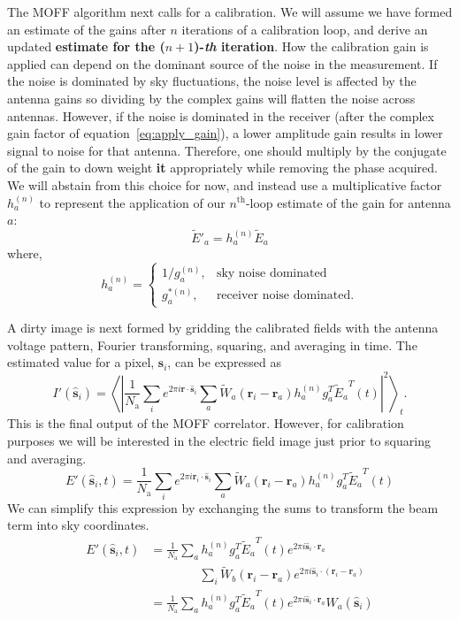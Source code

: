 \documentclass[a4paper,fleqn,usenatbib]{../mnras}
\newcommand{\Nant}{\ensuremath{N_{\mathrm{a}}}}
\newcommand{\s}{\ensuremath{\hat{\mathbf{s}}}} %
\newcommand{\ri}{\ensuremath{\mathbf{r}_i}}
\newcommand{\ra}{\ensuremath{\mathbf{r}_a}}
\newcommand{\beamr}{\ensuremath{\widetilde{W}}}
\newcommand{\beamtheta}{\ensuremath{W}}
\newcommand{\Er}[1]{\ensuremath{\widetilde{E}_{#1}}}
\newcommand{\Erest}[1]{\ensuremath{\widetilde{E}'_{#1}}}
\newcommand{\Ethetaest}{\ensuremath{E'}}
\begin{document}
The MOFF algorithm next calls for a calibration. We will assume we have formed an estimate of the gains after $n$ iterations of a calibration loop, and derive an updated {\bf estimate for the ($n+1$)-{\it th} iteration}. How the calibration gain is applied can depend on the dominant source of the noise in the measurement. If the noise is dominated by sky fluctuations, the noise level is affected by the antenna gains so dividing by the complex gains will flatten the noise across antennas. However, if the noise is dominated in the receiver (after the complex gain factor of equation~\ref{eq:apply_gain}), a lower amplitude gain results in lower signal to noise for that antenna. Therefore, one should multiply by the conjugate of the gain to down weight {\bf it} appropriately while removing the phase acquired. We will abstain from this choice for now, and instead use a multiplicative factor $h^{(n)}_a$ to represent the application of our $n^{\mathrm{th}}$-loop estimate of the gain for antenna $a$:
\begin{equation}
\Erest{a} = h^{(n)}_a \Er{a}
\end{equation}
where,
\begin{equation}
h^{(n)}_a=\begin{cases}
1/g^{(n)}_a, & \mbox{sky noise dominated} \\ 
g^{*(n)}_a, & \mbox{receiver noise dominated}.
\end{cases}
\end{equation}

A dirty image is next formed by gridding the calibrated fields with the antenna voltage pattern, Fourier transforming, squaring, and averaging in time. The estimated value for a pixel, $\s_i$, can be expressed as
\begin{equation}
I'(\s_i) = \left<\left| \frac{1}{\Nant}\sum_i e^{2\pi i \mathbf{r}\cdot \s_i} \sum_a \beamr_a(\ri - \ra) h^{(n)}_a g^T_a \Er{a}^T(t) \right|^2 \right>_t.
\end{equation}
This is the final output of the MOFF correlator. However, for calibration purposes we will be interested in the electric field image just prior to squaring and averaging.
\begin{equation}
\Ethetaest (\s_i,t) = \frac{1}{\Nant} \sum_i e^{2\pi i \ri \cdot \s_i} \sum_a \beamr_a(\ri - \ra) h^{(n)}_a g^T_a \Er{a}^T(t)
\end{equation}
We can simplify this expression by exchanging the sums to transform the beam term into sky coordinates.
\begin{align}\label{eq:epix}
\Ethetaest(\s_i,t) & = \frac{1}{\Nant} \sum_a h^{(n)}_a g^T_a\Er{a}^T(t) e^{2\pi i \s_i \cdot \ra} \nonumber \\ 
  & \qquad\qquad \sum_i \beamr_b(\ri-\ra)e^{2\pi i \s_i \cdot (\ri-\ra)} \nonumber\\
& = \frac{1}{\Nant} \sum_a h^{(n)}_a g^T_a\Er{a}^T(t) e^{2\pi i \s_i \cdot \ra}\beamtheta_a(\s_i)
\end{align}
\end{document}
